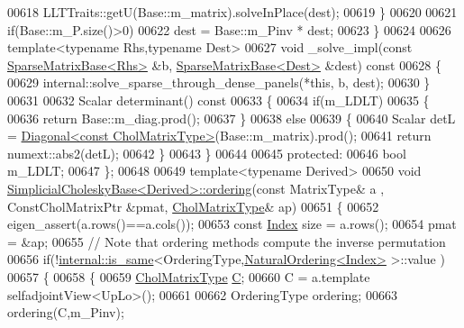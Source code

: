 \begin{DoxyCode}
00618           LLTTraits::getU(Base::m\_matrix).solveInPlace(dest);
00619       \}
00620 
00621       \textcolor{keywordflow}{if}(Base::m\_P.size()>0)
00622         dest = Base::m\_Pinv * dest;
00623     \}
00624     
00626     \textcolor{keyword}{template}<\textcolor{keyword}{typename} Rhs,\textcolor{keyword}{typename} Dest>
00627     \textcolor{keywordtype}{void} \_solve\_impl(\textcolor{keyword}{const} \hyperlink{group___sparse_core___module_class_eigen_1_1_sparse_matrix_base}{SparseMatrixBase<Rhs>} &b, 
      \hyperlink{group___sparse_core___module_class_eigen_1_1_sparse_matrix_base}{SparseMatrixBase<Dest>} &dest)\textcolor{keyword}{ const}
00628 \textcolor{keyword}{    }\{
00629       internal::solve\_sparse\_through\_dense\_panels(*\textcolor{keyword}{this}, b, dest);
00630     \}
00631     
00632     Scalar determinant()\textcolor{keyword}{ const}
00633 \textcolor{keyword}{    }\{
00634       \textcolor{keywordflow}{if}(m\_LDLT)
00635       \{
00636         \textcolor{keywordflow}{return} Base::m\_diag.prod();
00637       \}
00638       \textcolor{keywordflow}{else}
00639       \{
00640         Scalar detL = \hyperlink{group___core___module_class_eigen_1_1_diagonal}{Diagonal<const CholMatrixType>}(Base::m\_matrix).prod();
00641         \textcolor{keywordflow}{return} numext::abs2(detL);
00642       \}
00643     \}
00644     
00645   \textcolor{keyword}{protected}:
00646     \textcolor{keywordtype}{bool} m\_LDLT;
00647 \};
00648 
00649 \textcolor{keyword}{template}<\textcolor{keyword}{typename} Derived>
00650 \textcolor{keywordtype}{void} \hyperlink{group___sparse_cholesky___module_class_eigen_1_1_simplicial_cholesky_base}{SimplicialCholeskyBase<Derived>::ordering}(\textcolor{keyword}{const} MatrixType& a
      , ConstCholMatrixPtr &pmat, \hyperlink{group___sparse_core___module}{CholMatrixType}& ap)
00651 \{
00652   eigen\_assert(a.rows()==a.cols());
00653   \textcolor{keyword}{const} \hyperlink{namespace_eigen_a62e77e0933482dafde8fe197d9a2cfde}{Index} size = a.rows();
00654   pmat = &ap;
00655   \textcolor{comment}{// Note that ordering methods compute the inverse permutation}
00656   \textcolor{keywordflow}{if}(!\hyperlink{struct_eigen_1_1internal_1_1is__same}{internal::is\_same}<OrderingType,\hyperlink{group___ordering_methods___module_class_eigen_1_1_natural_ordering}{NaturalOrdering<Index>} >::value
      )
00657   \{
00658     \{
00659       \hyperlink{group___sparse_core___module}{CholMatrixType} \hyperlink{group___core___module}{C};
00660       C = a.template selfadjointView<UpLo>();
00661       
00662       OrderingType ordering;
00663       ordering(C,m\_Pinv);

\end{DoxyCode}
